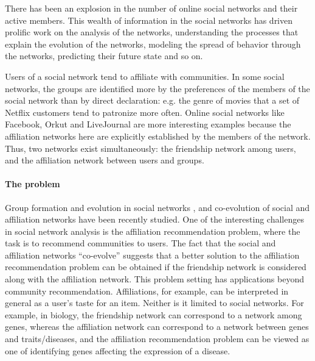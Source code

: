 There has been an explosion in the number of online social networks and their active members. This wealth of information in the social networks has driven prolific work on the analysis of the networks, understanding the processes that explain the evolution of the networks, modeling the spread of behavior through the networks, predicting their future state and so on.

Users of a social network tend to affiliate with communities. In some social networks, the groups are identified more by the preferences of the members of the social network than by direct declaration: e.g. the genre of movies that a set of Netflix customers tend to patronize more often. Online social networks like Facebook, Orkut and LiveJournal are more interesting examples because the affiliation networks here are explicitly established by the members of the network. Thus, two networks exist simultaneously: the friendship network among users, and the affiliation network between users and groups.

\paragraph*{The problem}
Group formation and evolution in social networks \cite{GroupFormation}, and co-evolution of social and affiliation networks \cite{Coevolution} have been recently studied. One of the interesting challenges in social network analysis is the affiliation recommendation problem, where the task is to recommend communities to users. The fact that the social and affiliation networks ``co-evolve'' suggests that a better solution to the affiliation recommendation problem can be obtained if the friendship network is considered along with the affiliation network. This problem setting has applications beyond community recommendation. Affiliations, for example, can be interpreted in general as a user's taste for an item. Neither is it limited to social networks. For example, in biology, the friendship network can correspond to a network among genes, whereas the affiliation network can correspond to a network between genes and traits/diseases, and the affiliation recommendation problem can be viewed as one of identifying genes affecting the expression of a disease.


